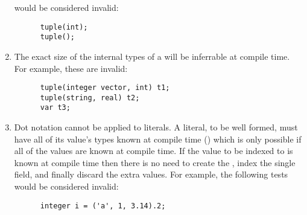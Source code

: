 \documentclass[../gazprea.tex]{subfiles}
\begin{document}
\begin{enumerate}
    would be considered invalid:
    \begin{lstlisting}
      tuple(int);
      tuple();
    \end{lstlisting}
  \item
    The exact size of the internal types of a  will be inferrable at compile time. For
    example, these are invalid:
    \begin{lstlisting}
      tuple(integer vector, int) t1;
      tuple(string, real) t2;
      var t3;
    \end{lstlisting}
  \item
    Dot notation cannot be applied to  literals. A  literal, to be well
    formed, must have all of its value's types known at compile time
    () which is only possible if all of the values are known at
    compile time. If the value to be indexed to is known at compile time then there is no need to
    create the , index the single field, and finally discard the extra values. For
    example, the following tests would be considered invalid:
    \begin{lstlisting}
      integer i = ('a', 1, 3.14).2;
    \end{lstlisting}
\end{enumerate}
\end{document}
